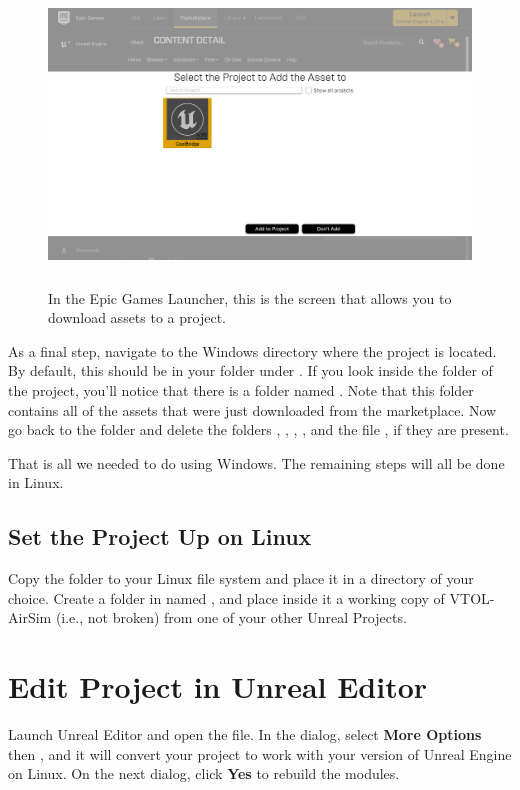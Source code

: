 \begin{figure}[h]
    \centering
    \includegraphics[height=225pt]{figures/egl_add_to_project_edit}
    \caption[Epic Games Launcher: Download assets to project]{
        In the Epic Games Launcher, this is the screen that allows you to download assets to a project.}%
    \label{fig:egl_add_to_project}
\end{figure}

As a final step, navigate to the Windows directory where the  project is located. By default, this should be in your  folder under . If you look inside the  folder of the project, you'll notice that there is a folder named . Note that this folder contains all of the assets that were just downloaded from the marketplace. Now go back to the  folder and delete the folders , , , , and the file , if they are present.

That is all we needed to do using Windows. The remaining steps will all be done in Linux.

\subsection{Set the Project Up on Linux}
Copy the  folder to your Linux file system and place it in a directory of your choice. Create a folder in  named , and place inside it a working copy of VTOL-AirSim (i.e., not broken) from one of your other Unreal Projects.

\section{Edit Project in Unreal Editor}\label{sec:edit_project_ueditor}
Launch Unreal Editor and open the  file. In the dialog, select \textbf{More Options} then , and it will convert your project to work with your version of Unreal Engine on Linux. On the next dialog, click \textbf{Yes} to rebuild the modules.

